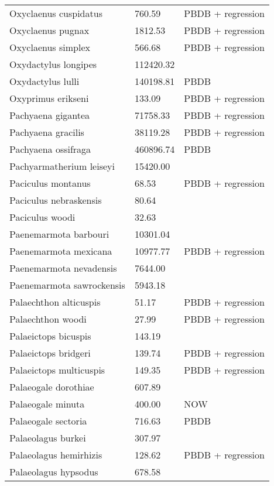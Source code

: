 \begin{center}
\begin{longtable}{p{} p{} p{} }
  Oxyclaenus cuspidatus & 760.59 & PBDB + regression \\ 
  Oxyclaenus pugnax & 1812.53 & PBDB + regression \\ 
  Oxyclaenus simplex & 566.68 & PBDB + regression \\ 
  Oxydactylus longipes & 112420.32 & \cite{Tomiya2013} \\ 
  Oxydactylus lulli & 140198.81 & PBDB \\ 
  Oxyprimus erikseni & 133.09 & PBDB + regression \\ 
  Pachyaena gigantea & 71758.33 & PBDB + regression \\ 
  Pachyaena gracilis & 38119.28 & PBDB + regression \\ 
  Pachyaena ossifraga & 460896.74 & PBDB \\ 
  Pachyarmatherium leiseyi & 15420.00 & \cite{McDonald2005} \\ 
  Paciculus montanus & 68.53 & PBDB + regression \\ 
  Paciculus nebraskensis & 80.64 & \cite{Tomiya2013} \\ 
  Paciculus woodi & 32.63 & \cite{Korth1993} \\ 
  Paenemarmota barbouri & 10301.04 & \cite{Tomiya2013} \\ 
  Paenemarmota mexicana & 10977.77 & PBDB + regression \\ 
  Paenemarmota nevadensis & 7644.00 & \cite{McKenna2011} \\ 
  Paenemarmota sawrockensis & 5943.18 & \cite{Tomiya2013} \\ 
  Palaechthon alticuspis & 51.17 & PBDB + regression \\ 
  Palaechthon woodi & 27.99 & PBDB + regression \\ 
  Palaeictops bicuspis & 143.19 & \cite{Simons1960} \\ 
  Palaeictops bridgeri & 139.74 & PBDB + regression \\ 
  Palaeictops multicuspis & 149.35 & PBDB + regression \\ 
  Palaeogale dorothiae & 607.89 & \cite{Tomiya2013} \\ 
  Palaeogale minuta & 400.00 & NOW \\ 
  Palaeogale sectoria & 716.63 & PBDB \\ 
  Palaeolagus burkei & 307.97 & \cite{Tomiya2013} \\ 
  Palaeolagus hemirhizis & 128.62 & PBDB + regression \\ 
  Palaeolagus hypsodus & 678.58 & \cite{Tomiya2013} \\ 

\end{longtable}
\end{center}
